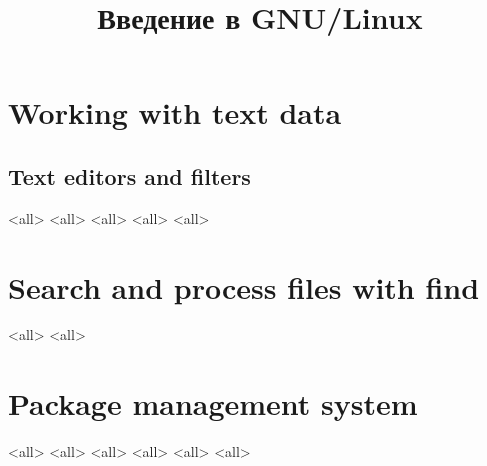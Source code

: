 

\title{Введение в GNU/Linux}








\begin{frame}
	\frametitle{}
	\titlepage
	\vspace{-0.5cm}
	\begin{center}
	\end{center}
\end{frame}





\section{Working with text data}

\subsection{Text editors and filters}
\mode<all>{}
\mode<all>{} %
\mode<all>{} %
\mode<all>{}
\mode<all>{}
\section{Search and process files with find}
\mode<all>{}
\mode<all>{}

\section{Package management system}
\mode<all>{}
\mode<all>{}
\mode<all>{}
\mode<all>{}
\mode<all>{}
\mode<all>{}


